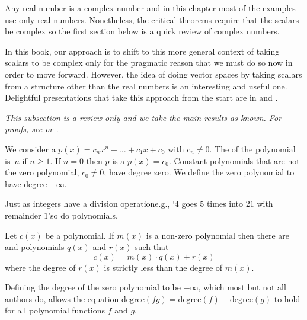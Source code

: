 Any real number is a complex number and
in this chapter most of the examples use
only real numbers.
Nonetheless, the critical theorems require that the scalars be complex so
the first section below is a quick review of complex numbers.

In this book, our approach is to shift to this more general context 
of taking scalars to be complex only for the 
pragmatic reason that we must do so now in order to 
move forward.
However, the idea of doing vector spaces 
by taking scalars from a structure other than the real
numbers is an interesting and useful one.
Delightful presentations that take this approach from the start are in
\cite{Halmos} and \cite{HoffmanKunze}.






\textit{
  This subsection is a review only and we take the main results as known.
  For proofs, see \cite{BirkhoffMaclane} or \cite{Ebbinghaus}.}

We consider a  
$p(x)=c_nx^n+\dots+c_1x+c_0$ with 
$c_n\neq 0$.
The 
of the polynomial is~$n$ if $n\geq 1$.
If $n=0$ then $p$ is a 
 $p(x)=c_0$. 
Constant polynomials that are not the zero polynomial, $c_0\neq 0$, 
have degree zero.
We define the zero polynomial to have degree 
$-\infty$.

Just as integers have a division operation\Dash e.g., 
`\( 4 \) goes \( 5 \) times into \( 21 \) with remainder \( 1 \)'\Dash so 
do polynomials.

\begin{theorem}
\label{th:EuclidForPolys}
Let \( c(x) \) be a polynomial.
If \( m(x) \) is a non-zero polynomial then there are  and
 polynomials \( q(x) \) and \( r(x) \) such that
\begin{equation*}
  c(x)=m(x)\cdot q(x)+r(x)
\end{equation*}
where the degree of \( r(x) \) is strictly less than the degree of \( m(x) \).
\end{theorem}

\begin{remark}
Defining 
the degree of the zero polynomial to be $-\infty$, 
which most but not all authors do, 
allows the equation $\text{degree}(fg)=\text{degree}(f)+\text{degree}(g)$
to hold for all polynomial functions $f$ and $g$.
\end{remark}


